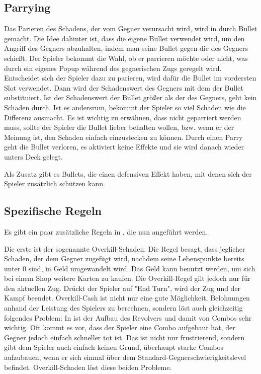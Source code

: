 \subsection{Parrying}\label{parrying}
Das Parieren des Schadens, der vom Gegner verursacht wird, wird in \FF durch Bullet gemacht.
Die Idee dahinter ist, dass die eigene Bullet verwendet wird, um den Angriff des Gegners abzuhalten, indem man
seine Bullet gegen die des Gegners schießt.
Der Spieler bekommt die Wahl, ob er parrieren möchte oder nicht, was durch ein eigenes Popup während des gegnerischen Zugs geregelt wird.
Entscheidet sich der Spieler dazu zu parieren, wird dafür die Bullet im vordersten Slot verwendet.
Dann wird der Schadenswert des Gegners mit dem der Bullet substituiert. Ist der Schadenswert der Bullet größer als der des Gegners,
geht kein Schaden durch. Ist es andersrum, bekommt der Spieler so viel Schaden wie die Differenz ausmacht.
Es ist wichtig zu erwähnen, dass nicht geparriert werden muss, sollte der Spieler die Bullet lieber behalten wollen,
bzw. wenn er der Meinung ist, den Schaden einfach einzustecken zu können. Durch einen Parry geht die Bullet verloren,
es aktiviert keine Effekte und sie wird danach wieder unters Deck gelegt.


Als Zusatz gibt es Bullets, die einen defensiven Effekt haben, mit denen sich der Spieler zusätzlich schützen kann.

\subsection{Spezifische Regeln}\label{spezifische_regeln}

Es gibt ein paar zusätzliche Regeln in \FF, die nun angeführt werden.


Die erste ist der sogenannte Overkill-Schaden.
Die Regel besagt, dass jeglicher Schaden, der dem Gegner zugefügt wird, nachdem seine Lebenspunkte bereits unter 0 sind,
in Geld umgewandelt wird. Das Geld kann benutzt werden, um sich bei einem Shop weitere Karten zu kaufen.
Die Overkill-Regel gilt jedoch nur für den aktuellen Zug. Drückt der Spieler auf "End Turn", wird der Zug und der Kampf beendet.
Overkill-Cash ist nicht nur eine gute Möglichkeit, Belohnungen anhand der Leistung des Spielers zu berechnen,
sondern löst auch gleichzeitig folgendes Problem: In \FF ist der Aufbau des Revolvers und damit von Combos sehr wichtig.
Oft kommt es vor, dass der Spieler eine Combo aufgebaut hat, der Gegner jedoch einfach schneller tot ist.
Das ist nicht nur frustrierend, sondern gibt dem Spieler auch einfach keinen Grund, überhaupt starke Combos aufzubauen,
wenn er sich einmal über dem Standard-Gegnerschwierigkeitslevel befindet. Overkill-Schaden löst diese beiden Probleme.


